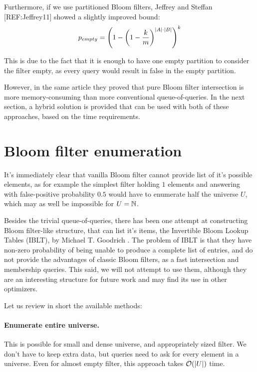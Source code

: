 Furthermore, if we use partitioned Bloom filters, Jeffrey and Steffan
[REF:Jeffrey11] showed a slightly improved bound:
\begin{align}
	p_{empty} = \left(1 - \left( 1 - {k \over m}\right)^{|A|\cdot |B|}\right)^k
\end{align}

This is due to the fact that it is enough to have one empty partition to consider
the filter empty, as every query would result in false in the empty partition.

However, in the same article they proved that pure Bloom filter intersection is more
memory-consuming than more conventional queue-of-queries. In the next section,
a hybrid solution is provided that can be used with both of these approaches,
based on the time requirements.

\section{Bloom filter enumeration}

It's immediately clear that vanilla Bloom filter cannot provide list of it's
possible elements, as for example the simplest filter holding $1$ elements and
answering with false-positive probability $0.5$ would have to enumerate half the
universe $U$, which may as well be impossible for $U=\mathbb{N}$.

Besides the trivial queue-of-queries, there has been one attempt at constructing
Bloom filter-like structure, that can list it's items, the Invertible Bloom
Lookup Tables (IBLT), by Michael T. Goodrich \cite{goodrich:2011}. The problem of IBLT is
that they have non-zero probability of being unable to produce a complete list
of entries, and do not provide the advantages of classic Bloom filters, as a
fast intersection and membership queries. This said, we will not attempt to use
them, although they are an interesting structure for future work and may find
its use in other optimizers.

Let us review in short the available methods:

\paragraph{Enumerate entire universe.} This is possible for small and dense
universe, and appropriately sized filter. We don't have to keep extra data, but
queries need to ask for every element in a universe. Even for almost empty
filter, this approach takes $\mathcal{O}(|U|)$ time.

